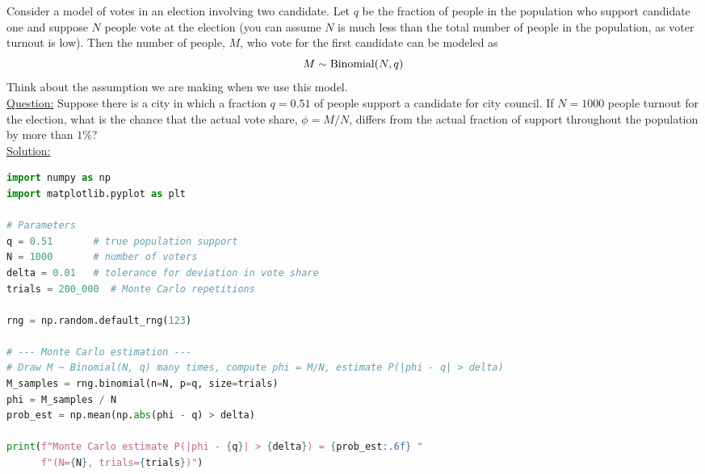  
 \begin{example}
 Consider a model of votes in an election involving two candidate. Let $q$ be the fraction of people in the population who support candidate one and suppose $N$ people vote at the election (you can assume $N$ is much less than the total number of people in the population, as voter turnout is low). Then the number of people, $M$, who vote for the first candidate can be modeled as 
\begin{equation*}
M \sim {\rm Binomial}(N,q)
\end{equation*}
Think about the assumption we are making when we use this model. \\

 \noindent
\underline{Question:} Suppose there is a city in which a fraction $q = 0.51$ of people support a candidate for city council. If $N=1000$ people turnout for the election, what is the chance that the actual vote share, $\phi = M/N$, differs from the actual fraction of support throughout the population by more than $1\%$?\\

 \noindent
\underline{Solution:} 

\begin{lstlisting}[language=Python]
import numpy as np
import matplotlib.pyplot as plt

# Parameters
q = 0.51       # true population support
N = 1000       # number of voters
delta = 0.01   # tolerance for deviation in vote share
trials = 200_000  # Monte Carlo repetitions

rng = np.random.default_rng(123)

# --- Monte Carlo estimation ---
# Draw M ~ Binomial(N, q) many times, compute phi = M/N, estimate P(|phi - q| > delta)
M_samples = rng.binomial(n=N, p=q, size=trials)
phi = M_samples / N
prob_est = np.mean(np.abs(phi - q) > delta)

print(f"Monte Carlo estimate P(|phi - {q}| > {delta}) = {prob_est:.6f} "
      f"(N={N}, trials={trials})")
\end{lstlisting}
\end{example}

